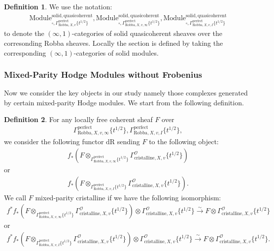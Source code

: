 \documentclass[12pt]{book}
\theoremstyle{definition}
\newtheorem{definition}{Definition}
\begin{document}
\begin{definition}
We use the notation:
\begin{align}
\mathrm{Module}^\mathrm{solid,quasicoherent}_{\square,\Gamma^\mathrm{perfect}_{\text{Robba},X,v}\{t^{1/2}\}},\mathrm{Module}^\mathrm{solid,quasicoherent}_{\square,\Gamma^\mathrm{perfect}_{\text{Robba},X,v,\infty}\{t^{1/2}\}},
\mathrm{Module}^\mathrm{solid,quasicoherent}_{\square,\Gamma^\mathrm{perfect}_{\text{Robba},X,v,I}\{t^{1/2}\}} 
\end{align}
to denote the $(\infty,1)$-categories of solid quasicoherent sheaves over the corresonding Robba sheaves. Locally the section is defined by taking the corresponding $(\infty,1)$-categories of solid modules.
\end{definition}


\subsubsection{Mixed-Parity Hodge Modules without Frobenius}

\noindent Now we consider the key objects in our study namely those complexes generated by certain mixed-parity Hodge modules. We start from the following definition.

\begin{definition}
For any locally free coherent sheaf $F$ over
\begin{align}
\Gamma^\mathrm{perfect}_{\text{Robba},X,v,\infty}\{t^{1/2}\},\Gamma^\mathrm{perfect}_{\text{Robba},X,v,I}\{t^{1/2}\},
\end{align} 
we consider the following functor $\mathrm{dR}$ sending $F$ to the following object:
\begin{align}
f_*(F\otimes_{\Gamma^\mathrm{perfect}_{\text{Robba},X,v,\infty}\{t^{1/2}\}} \Gamma^\mathcal{O}_{\text{cristalline},X,v}\{t^{1/2}\})
\end{align}
or 
\begin{align}
f_*(F\otimes_{\Gamma^\mathrm{perfect}_{\text{Robba},X,v,I}\{t^{1/2}\}} \Gamma^\mathcal{O}_{\text{cristalline},X,v}\{t^{1/2}\}).
\end{align}
We call $F$ mixed-parity cristalline if we have the following isomorphism:
\begin{align}
f^*f_*(F\otimes_{\Gamma^\mathrm{perfect}_{\text{Robba},X,v,\infty}\{t^{1/2}\}} \Gamma^\mathcal{O}_{\text{cristalline},X,v}\{t^{1/2}\}) \otimes \Gamma^\mathcal{O}_{\text{cristalline},X,v}\{t^{1/2}\} \overset{\sim}{\longrightarrow} F \otimes \Gamma^\mathcal{O}_{\text{cristalline},X,v}\{t^{1/2}\} 
\end{align}
or 
\begin{align}
f^*f_*(F\otimes_{\Gamma^\mathrm{perfect}_{\text{Robba},X,v,I}\{t^{1/2}\}} \Gamma^\mathcal{O}_{\text{cristalline},X,v}\{t^{1/2}\}) \otimes \Gamma^\mathcal{O}_{\text{cristalline},X,v}\{t^{1/2}\} \overset{\sim}{\longrightarrow} F \otimes \Gamma^\mathcal{O}_{\text{cristalline},X,v}\{t^{1/2}\}. 
\end{align}
\end{definition}
\end{document}
